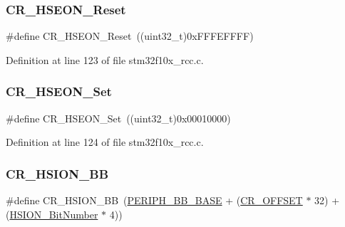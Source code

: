 \subsubsection{\texorpdfstring{C\+R\+\_\+\+H\+S\+E\+O\+N\+\_\+\+Reset}{CR\_HSEON\_Reset}}
{\footnotesize\ttfamily \#define C\+R\+\_\+\+H\+S\+E\+O\+N\+\_\+\+Reset~((uint32\+\_\+t)0x\+F\+F\+F\+E\+F\+F\+F\+F)}



Definition at line 123 of file stm32f10x\+\_\+rcc.\+c.

\mbox{\label{group___r_c_c___private___defines_gaca6ef9e2f11b921355809a5eccfec864}} 
\subsubsection{\texorpdfstring{C\+R\+\_\+\+H\+S\+E\+O\+N\+\_\+\+Set}{CR\_HSEON\_Set}}
{\footnotesize\ttfamily \#define C\+R\+\_\+\+H\+S\+E\+O\+N\+\_\+\+Set~((uint32\+\_\+t)0x00010000)}



Definition at line 124 of file stm32f10x\+\_\+rcc.\+c.

\mbox{\label{group___r_c_c___private___defines_gac3290a833c0e35ec17d32c2d494e6133}} 
\subsubsection{\texorpdfstring{C\+R\+\_\+\+H\+S\+I\+O\+N\+\_\+\+BB}{CR\_HSION\_BB}}
{\footnotesize\ttfamily \#define C\+R\+\_\+\+H\+S\+I\+O\+N\+\_\+\+BB~(\hyperlink{group___peripheral__memory__map_gaed7efc100877000845c236ccdc9e144a}{P\+E\+R\+I\+P\+H\+\_\+\+B\+B\+\_\+\+B\+A\+SE} + (\hyperlink{group___r_c_c___private___defines_gafa1d3d0ea72132df651c76fc1bdffffc}{C\+R\+\_\+\+O\+F\+F\+S\+ET} $\ast$ 32) + (\hyperlink{group___r_c_c___private___defines_ga3d3085e491cbef815d223afbe5bf1930}{H\+S\+I\+O\+N\+\_\+\+Bit\+Number} $\ast$ 4))}



